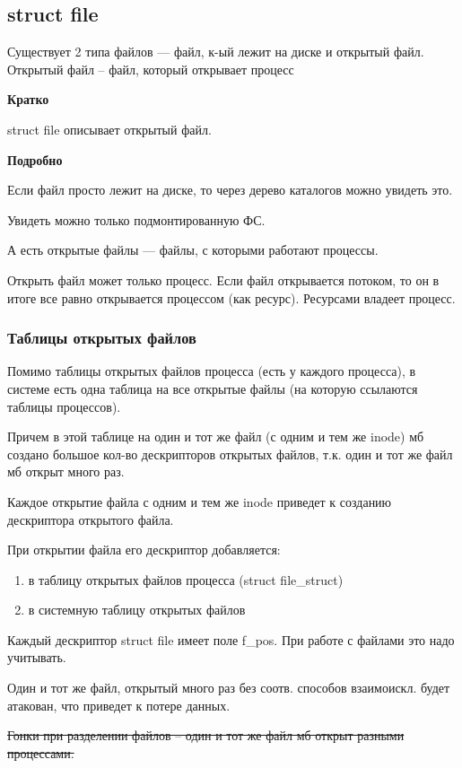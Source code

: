 \subsection{struct file}

Существует 2 типа файлов --- файл, к-ый лежит на диске и открытый файл. Открытый файл -- файл, который открывает процесс

\textbf{Кратко}

struct file описывает открытый файл.

\textbf{Подробно}

Если файл просто лежит на диске, то через дерево каталогов можно увидеть это. 

Увидеть можно только подмонтированную ФС.

А есть открытые файлы --- файлы, с которыми работают процессы.

Открыть файл может только процесс. Если файл открывается потоком, то он в итоге все равно открывается процессом (как ресурс). Ресурсами владеет процесс.


\subsubsection{Таблицы открытых файлов}

Помимо таблицы открытых файлов процесса (есть у каждого процесса), в системе есть одна таблица на все открытые файлы (на которую ссылаются таблицы процессов).

Причем в этой таблице на один и тот же файл (с одним и тем же inode) мб создано большое кол-во дескрипторов открытых файлов, т.к. один и тот же файл мб открыт много раз. 

Каждое открытие файла с одним и тем же inode приведет к созданию дескриптора открытого файла.

При открытии файла его дескриптор добавляется:
\begin{enumerate}
    \item в таблицу открытых файлов процесса (struct file\_struct)
    \item в системную таблицу открытых файлов
\end{enumerate}

Каждый дескриптор struct file имеет поле f\_pos. При работе с файлами это надо учитывать.

Один и тот же файл, открытый много раз без соотв. способов взаимоискл. будет атакован, что приведет к потере данных.

\sout{Гонки при разделении файлов -- один и тот же файл мб открыт разными процессами.}

